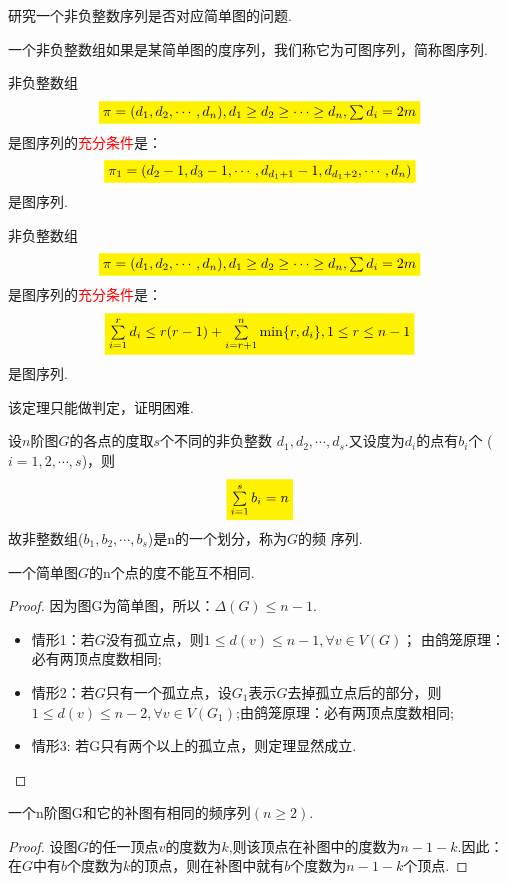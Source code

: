 \noindent {\bfseries \textcolor{ecolor}{图序列及其性质：}}

研究一个非负整数序列是否对应简单图的问题.
\begin{definition}[图序列]
一个非负整数组如果是某简单图的度序列，我们称它为可图序列，简称图序列.
\end{definition}

\begin{theorem}
	非负整数组
	\[
	\colorbox{yellow}{$\pi=(d_1, d_2,\cdots, d_n), d_1\geq d_2 \geq \cdots \geq d_n, \sum\limits d_i = 2m$}
	\]
	是图序列的\textcolor{red}{充分条件}是：
	\[
	\colorbox{yellow}{$\pi_1=(d_2-1, d_3-1,\cdots, d_{d_1+1}-1, d_{d_1+2}, \cdots, d_n)$}
	\]是图序列.
\end{theorem}

\begin{theorem}[厄多斯1960]
	非负整数组
	\[
	\colorbox{yellow}{$\pi=(d_1, d_2,\cdots, d_n), d_1\geq d_2 \geq \cdots \geq d_n, \sum\limits d_i = 2m$}
	\]
	是图序列的\textcolor{red}{充分条件}是：
	\[
	\colorbox{yellow}{$\sum\limits_{i=1}^r d_i \leq r(r-1)+ \sum \limits_{i=r+1}^n \min\{r,d_i\}, 1 \leq r \leq n-1$}
	\]是图序列.
\end{theorem}
\begin{note}
	该定理只能做判定，证明困难.
\end{note}


\noindent {\bfseries \textcolor{ecolor}{图的频序列及其性质：}}
\begin{definition}[频序列]
设$n$阶图$G$的各点的度取$s$个不同的非负整数
$d_1,d_2,\cdots, d_s$.又设度为$d_i$的点有$b_i$个 ($i = 1,2,\cdots,s$)，则
\[
\colorbox{yellow}{$\sum\limits_{i=1}^{s}b_i=n$}
\]
故非整数组($b_1,b_2,\cdots, b_s$)是n的一个划分，称为$G$的频
序列.
\end{definition}
\begin{theorem}
一个简单图$G$的n个点的度不能互不相同.
\end{theorem}
\begin{proof}
因为图G为简单图，所以：$\varDelta(G)\leq n-1$.
\begin{itemize}
	\item 情形1：若$G$没有孤立点，则$1\leq d(v) \leq n-1, \forall v\in V(G)$；
	由鸽笼原理：必有两顶点度数相同;
	\item 情形2：若$G$只有一个孤立点，设$G_1$表示$G$去掉孤立点后的部分，则$1\leq d(v) \leq n-2, \forall v\in V(G_1)$;由鸽笼原理：必有两顶点度数相同;
	\item 情形3: 若G只有两个以上的孤立点，则定理显然成立.
\end{itemize}
\end{proof}
\begin{theorem}
一个n阶图G和它的补图有相同的频序列$(n\geq 2)$.
\end{theorem}
\begin{proof}
设图$G$的任一顶点$v$的度数为$k$,则该顶点在补图中的度数为$n-1-k$.因此：在$G$中有$b$个度数为$k$的顶点，则在补图中就有$b$个度数为$n-1-k$个顶点.
\end{proof}



